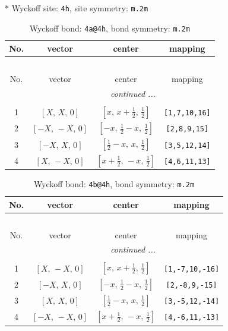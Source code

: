 \documentclass[fleqn,8pt]{jsarticle}
\begin{document}
* Wyckoff site: {\tt 4h}, site symmetry: {\tt m.2m}
\renewcommand{\arraystretch}{1.2}
\begin{longtable}{cccc}
\caption{Wyckoff bond: {\tt 4a@4h}, bond symmetry: {\tt m.2m}}
 \\
 \hline \hline
No. & vector & center & mapping \\ \hline \endfirsthead

\multicolumn{3}{l}{\tablename\ \thetable{}} \\
 \hline \hline
No. & vector & center & mapping \\ \hline \endhead

 \hline \hline
\multicolumn{3}{r}{\footnotesize\it continued ...} \\ \endfoot

 \hline \hline
\multicolumn{3}{r}{} \\ \endlastfoot

1 & $\left[ X,\, X,\, 0 \right]$ & $\left[ x,\, x + \frac{1}{2},\, \frac{1}{2} \right]$ & {\tt [1,7,10,16]} \\ \hline
2 & $\left[ - X,\, - X,\, 0 \right]$ & $\left[ - x,\, \frac{1}{2} - x,\, \frac{1}{2} \right]$ & {\tt [2,8,9,15]} \\ \hline
3 & $\left[ - X,\, X,\, 0 \right]$ & $\left[ \frac{1}{2} - x,\, x,\, \frac{1}{2} \right]$ & {\tt [3,5,12,14]} \\ \hline
4 & $\left[ X,\, - X,\, 0 \right]$ & $\left[ x + \frac{1}{2},\, - x,\, \frac{1}{2} \right]$ & {\tt [4,6,11,13]} \\
\end{longtable}
\renewcommand{\arraystretch}{1.2}
\begin{longtable}{cccc}
\caption{Wyckoff bond: {\tt 4b@4h}, bond symmetry: {\tt m.2m}}
 \\
 \hline \hline
No. & vector & center & mapping \\ \hline \endfirsthead

\multicolumn{3}{l}{\tablename\ \thetable{}} \\
 \hline \hline
No. & vector & center & mapping \\ \hline \endhead

 \hline \hline
\multicolumn{3}{r}{\footnotesize\it continued ...} \\ \endfoot

 \hline \hline
\multicolumn{3}{r}{} \\ \endlastfoot

1 & $\left[ X,\, - X,\, 0 \right]$ & $\left[ x,\, x + \frac{1}{2},\, \frac{1}{2} \right]$ & {\tt [1,-7,10,-16]} \\ \hline
2 & $\left[ - X,\, X,\, 0 \right]$ & $\left[ - x,\, \frac{1}{2} - x,\, \frac{1}{2} \right]$ & {\tt [2,-8,9,-15]} \\ \hline
3 & $\left[ X,\, X,\, 0 \right]$ & $\left[ \frac{1}{2} - x,\, x,\, \frac{1}{2} \right]$ & {\tt [3,-5,12,-14]} \\ \hline
4 & $\left[ - X,\, - X,\, 0 \right]$ & $\left[ x + \frac{1}{2},\, - x,\, \frac{1}{2} \right]$ & {\tt [4,-6,11,-13]} \\
\end{longtable}
\end{document}
